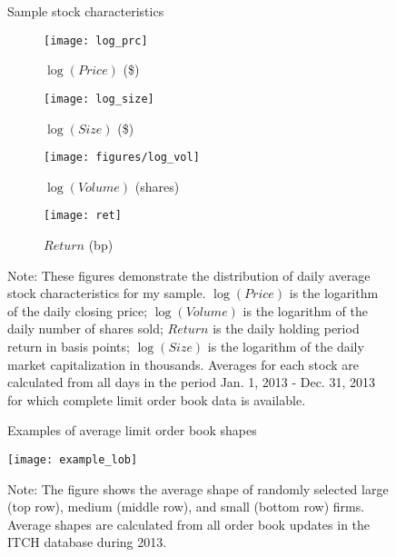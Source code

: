 \clearpage

\begin{figure}[ht!]
\small
\linespread{1}
\centering
\captionsetup{labelsep=colon, font=footnotesize, justification=centerfirst, width=\linewidth}
\caption{Sample stock characteristics}
\label{fig:crsp}
\begin{subfigure}[b]{0.49\textwidth}
\small
\texttt{[image: log\_prc]}
\captionsetup{labelformat=simple, labelsep=period, font=footnotesize, justification=centerfirst, width=\linewidth, belowskip=-15pt}
\caption{$\log(Price)$ (\$)}
\end{subfigure}
\begin{subfigure}[b]{0.49\textwidth}
\small
\texttt{[image: log\_size]}
\captionsetup{labelformat=simple, labelsep=period, font=footnotesize, justification=centerfirst, width=\linewidth, belowskip=-15pt}
\caption{$\log(Size)$ (\$)}
\end{subfigure}
%
\begin{subfigure}[b]{0.49\textwidth}
\small
\texttt{[image: figures/log\_vol]}
\captionsetup{labelformat=simple, labelsep=period, font=footnotesize, justification=centerfirst, width=\linewidth, belowskip=-15pt}
\caption{$\log(Volume)$ (shares)}
\end{subfigure}
\begin{subfigure}[b]{0.49\textwidth}
\small
\texttt{[image: ret]}
\captionsetup{labelformat=simple, labelsep=period, font=footnotesize, justification=centerfirst, width=\linewidth, belowskip=-15pt}
\caption{$Return$ (bp)}
\end{subfigure}
\captionsetup{position=below, font=footnotesize, justification=justified, width=\linewidth}
\caption*{Note: These figures demonstrate the distribution of daily average stock characteristics for my sample. $\log(Price)$ is the logarithm of the daily closing price; $\log(Volume)$ is the logarithm of the daily number of shares sold; $Return$ is the daily holding period return in basis points; $\log(Size)$ is the logarithm of the daily market capitalization in thousands. Averages for each stock  are calculated from all days in the period Jan. 1, 2013 - Dec. 31, 2013 for which complete limit order book data is available.}
\end{figure}

\begin{sidewaysfigure}[p]
\linespread{1}
\centering
\captionsetup{labelsep=colon, font=footnotesize, justification=centerfirst, width=\linewidth}
\caption{Examples of average limit order book shapes}
\label{fig:examples}
\texttt{[image: example\_lob]}
\captionsetup{font=footnotesize, justification=justified, width=\linewidth}
\caption*{Note: The figure shows the average shape of randomly selected large (top row), medium (middle row), and small (bottom row) firms. Average shapes are calculated from all order book updates in the ITCH database during 2013.}
\end{sidewaysfigure}

